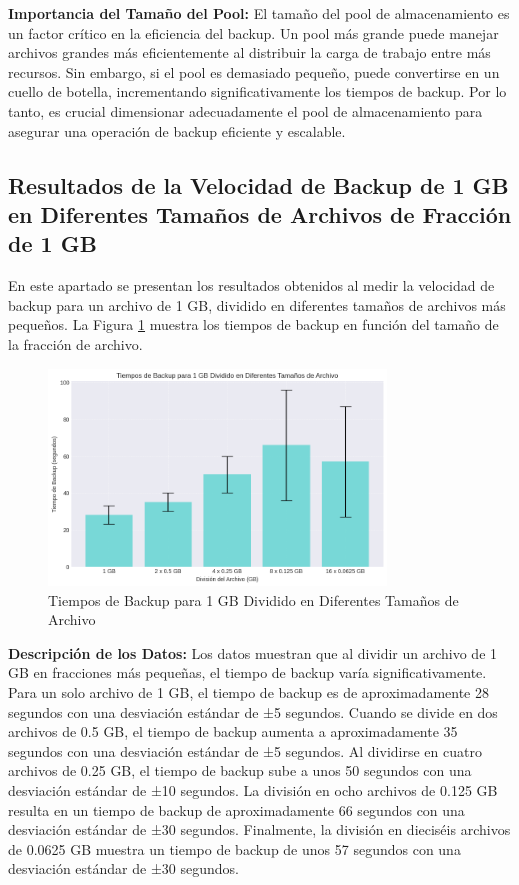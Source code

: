 \textbf{Importancia del Tamaño del Pool:}
El tamaño del pool de almacenamiento es un factor crítico en la eficiencia del backup. Un pool más grande puede manejar archivos grandes más eficientemente al distribuir la carga de trabajo entre más recursos. Sin embargo, si el pool es demasiado pequeño, puede convertirse en un cuello de botella, incrementando significativamente los tiempos de backup. Por lo tanto, es crucial dimensionar adecuadamente el pool de almacenamiento para asegurar una operación de backup eficiente y escalable.




\subsection{Resultados de la Velocidad de Backup de 1 GB en Diferentes Tamaños de Archivos de Fracción de 1 GB}

En este apartado se presentan los resultados obtenidos al medir la velocidad de backup para un archivo de 1 GB, dividido en diferentes tamaños de archivos más pequeños. La Figura \ref{fig:backup-velocidad1gb} muestra los tiempos de backup en función del tamaño de la fracción de archivo.

\begin{figure}[H]
    \centering
    \includegraphics[width=0.8\textwidth]{backup_velocidad1gb.png}
    \caption{Tiempos de Backup para 1 GB Dividido en Diferentes Tamaños de Archivo}
    \label{fig:backup-velocidad1gb}
\end{figure}

\textbf{Descripción de los Datos:}
Los datos muestran que al dividir un archivo de 1 GB en fracciones más pequeñas, el tiempo de backup varía significativamente. Para un solo archivo de 1 GB, el tiempo de backup es de aproximadamente 28 segundos con una desviación estándar de ±5 segundos. Cuando se divide en dos archivos de 0.5 GB, el tiempo de backup aumenta a aproximadamente 35 segundos con una desviación estándar de ±5 segundos. Al dividirse en cuatro archivos de 0.25 GB, el tiempo de backup sube a unos 50 segundos con una desviación estándar de ±10 segundos. La división en ocho archivos de 0.125 GB resulta en un tiempo de backup de aproximadamente 66 segundos con una desviación estándar de ±30 segundos. Finalmente, la división en dieciséis archivos de 0.0625 GB muestra un tiempo de backup de unos 57 segundos con una desviación estándar de ±30 segundos.

